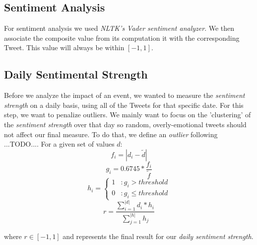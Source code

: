 \documentclass[11pt]{article}
\begin{document}
	\subsection{Sentiment Analysis}
	\label{sub:sentiment_analysis}
	For sentiment analysis we used \textit{NLTK's Vader sentiment analyzer}. We then associate the composite value from its computation it with the corresponding Tweet. This value will always be within $[-1, 1]$.
	
	\subsection{Daily Sentimental Strength}
	\label{sub:daily_sentiment_strength}
	Before we analyze the impact of an event, we wanted to measure the \textit{sentiment strength} on a daily basis, using all of the Tweets for that specific date. For this step, we want to penalize outliers. We mainly want to focus on the 'clustering' of the \textit{sentiment strength} over that day so random, overly-emotional tweets should not affect our final measure.
	To do that, we define an \textit{outlier} following ...TODO.... For a given set of values $d$:
	\begin{equation}
	f_{i} = |d_{i} - \tilde{d}|
	\end{equation} 
	\begin{equation}
	g_{i} = 0.6745 * \frac{f_{i}}{\tilde{f}}
	\end{equation}
	\begin{equation}
	h_{i} = \left\{
	\begin{array}{lr}
	1 & : g_{i} > threshold\\
	0 & : g_{i} \leq threshold
	\end{array}
	\right.
	\end{equation}
	\begin{equation}
	r = \frac{\sum_{i=1}^{|d|} d_{i} * h_{i}}{\sum_{j=1}^{|h|} h_{j}}
	\end{equation} 
	
	where $r \in [-1, 1]$ and represents the final result for our \textit{daily sentiment strength}.
	
\end{document}
